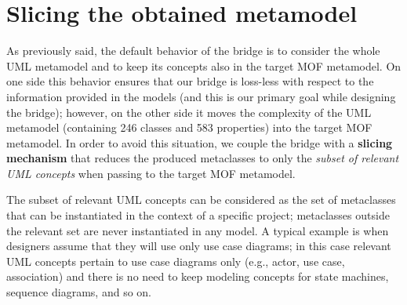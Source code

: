 

\section{Slicing the obtained metamodel}\label{sec:slicing}

As previously said, the default behavior of the bridge is to consider the whole UML metamodel and to keep its concepts also in the
target MOF metamodel. On one side this behavior ensures that our bridge is loss-less with respect to the information
provided in the models (and this is our primary goal while designing the bridge);
however, on the other side it moves the complexity of the UML metamodel (containing 246 classes and 583 properties)
into the target MOF metamodel.
In order to avoid this situation, we couple the bridge with a \textbf{slicing mechanism} that reduces the produced metaclasses
to only the \textit{subset of relevant UML concepts} when passing to the target MOF metamodel.

The subset of relevant UML concepts can be considered as the set of metaclasses that can be instantiated
in the context of a specific project; metaclasses outside the relevant set are never instantiated in any model.
A typical example is when designers assume that they will use only use case diagrams; 
in this case relevant UML concepts pertain to use case diagrams only (e.g., actor, use case, association) 
and there is no need to keep modeling concepts for state machines, sequence diagrams, and so on.
%

